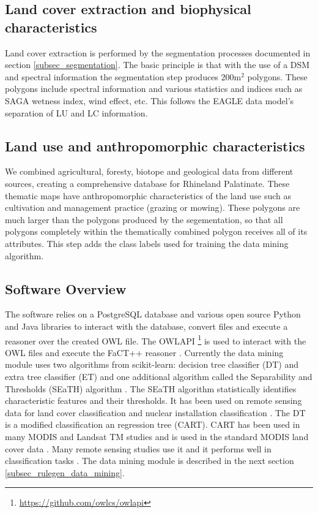 \documentclass[authoryear, review,12pt,number]{elsarticle}
\begin{document}
\subsection{Land cover extraction and biophysical characteristics}
Land cover extraction is performed by the segmentation processes documented in  
section \ref{subsec_segmentation}. The basic principle is that with the use of 
a DSM and spectral information the segmentation step produces 200m$^{2}$ 
polygons. These polygons include spectral information and various statistics 
and indices such as SAGA wetness index, wind effect, etc.   
This follows the EAGLE data model's separation of LU and LC information.

\subsection{Land use and anthropomorphic characteristics}
We combined agricultural, foresty, biotope and geological data from different 
sources, creating a comprehensive database for Rhineland Palatinate. These 
thematic maps have anthropomorphic characteristics of the land use such as 
cultivation and management practice (grazing or mowing). These polygons are 
much larger than the polygons produced by the segementation, so that all 
polygons completely within the thematically combined polygon receives all of 
its attributes. This step adds the class labels used for training the data 
mining algorithm. 

\label{subsec_software}
\subsection{Software Overview}
The software relies on a PostgreSQL database and various open source Python and 
Java libraries to interact with the database, convert files and execute a 
reasoner over the created OWL file.
The OWLAPI \footnote{\url{https://github.com/owlcs/owlapi}} is used to interact 
with the OWL files and execute the FaCT++
reasoner \citep{Tsarkov2006}. Currently the data mining module uses two 
algorithms from scikit-learn: decision tree classifier (DT) and extra tree 
classifier (ET) and one additional algorithm called the Separability and 
Thresholds (SEaTH) algorithm \citep{Nussbaum2006}. 
The SEaTH algorithm statistically identifies characteristic features and their
thresholds. It has been used on remote sensing data for land cover
classification \citep{Gao2011, Mhangara2013} and nuclear installation
classification \citep{Nussbaum2006}.  The DT is a modified classification an
regression tree (CART)\citep{scikit-learn}. CART has been used in many MODIS and
Landsat TM studies and is used in the standard MODIS land cover data
\citep{friedl2002global}. Many remote sensing studies use it and it performs
well in classification tasks \citep{Li_2014, Qian_2014, Shao_2012}.
The data mining module is described in the next section \ref{subsec_rulegen_data_mining}. 
\end{document}
